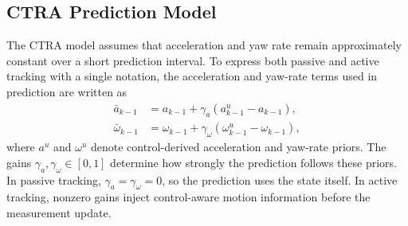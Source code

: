 \documentclass[conference]{IEEEtran}
\begin{document}
\subsection{CTRA Prediction Model}

The CTRA model assumes that acceleration and yaw rate remain approximately constant over a short prediction interval. To express both passive and active tracking with a single notation, the acceleration and yaw-rate terms used in prediction are written as
\begin{align}
\bar{a}_{k-1} &= a_{k-1} + \gamma_a(a^{u}_{k-1}-a_{k-1}),
\label{eq:active_accel}\\
\bar{\omega}_{k-1} &= \omega_{k-1} + \gamma_\omega(\omega^{u}_{k-1}-\omega_{k-1}),
\label{eq:active_yaw_rate}
\end{align}
where $a^{u}$ and $\omega^{u}$ denote control-derived acceleration and yaw-rate priors. The gains $\gamma_a,\gamma_\omega\in[0,1]$ determine how strongly the prediction follows these priors. In passive tracking, $\gamma_a=\gamma_\omega=0$, so the prediction uses the state itself. In active tracking, nonzero gains inject control-aware motion information before the measurement update.
\end{document}
